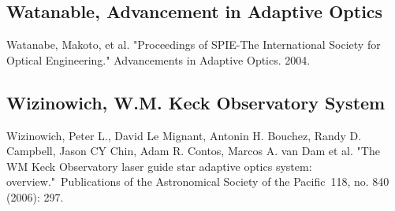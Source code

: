 \documentclass{article}
\begin{document}
\subsection{Watanable, Advancement in Adaptive Optics}
Watanabe, Makoto, et al. "Proceedings of SPIE-The International Society for Optical Engineering." Advancements in Adaptive Optics. 2004.
\subsection{Wizinowich, W.M. Keck Observatory System}
Wizinowich, Peter L., David Le Mignant, Antonin H. Bouchez, Randy D. Campbell, Jason CY Chin, Adam R. Contos, Marcos A. van Dam et al. "The WM Keck Observatory laser guide star adaptive optics system: overview." Publications of the Astronomical Society of the Pacific 118, no. 840 (2006): 297.
\end{document}
